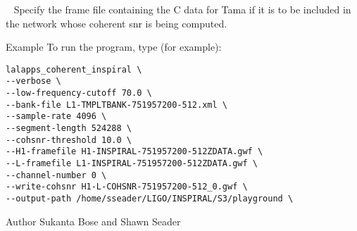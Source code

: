 \begin{entry}
\begin{entry}
\item[\option{--T-framefile}~\parm{FILE}] Specify the frame file containing
the C data for Tama if it is to be included in the network whose coherent snr
is being computed.

\end{entry}

\item[Example]
To run the program, type (for example):
\begin{verbatim}
lalapps_coherent_inspiral \
--verbose \
--low-frequency-cutoff 70.0 \
--bank-file L1-TMPLTBANK-751957200-512.xml \
--sample-rate 4096 \
--segment-length 524288 \
--cohsnr-threshold 10.0 \
--H1-framefile H1-INSPIRAL-751957200-512ZDATA.gwf \
--L-framefile L1-INSPIRAL-751957200-512ZDATA.gwf \
--channel-number 0 \
--write-cohsnr H1-L-COHSNR-751957200-512_0.gwf \
--output-path /home/sseader/LIGO/INSPIRAL/S3/playground \
\end{verbatim} 


\item[Author] Sukanta Bose and Shawn Seader 
\end{entry}
